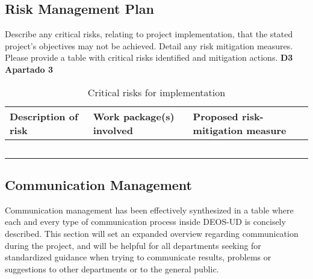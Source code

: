 \subsection{Risk Management Plan}

Describe any critical risks, relating to project implementation, that the stated project’s objectives may not be achieved. Detail any risk mitigation measures. Please provide a table with critical risks identified and mitigation actions. \textbf{D3 Apartado 3}

\begin{longtable}[H]{p{4cm} p{4.7cm} p{5cm}}
	\toprule[2pt]
	
	\textbf{Description of risk} & \textbf{Work package(s) involved} & \textbf{Proposed risk-mitigation measure} \\
	
	\midrule[1.5pt] 
	\endhead
	
	 &  &  \vspace{0.2cm} \\
	
	\midrule

	 &  &  \vspace{0.2cm} \\
	
	\midrule
	
	 &  &   \vspace{0.2cm} \\

	\midrule

 	 &  &   \vspace{0.2cm} \\
	
	\bottomrule[2pt]
	
	\caption{Critical risks for implementation}
	\label{workpackages}
\end{longtable}

\subsection{Communication Management}

Communication management has been effectively synthesized in a table where each and every type of communication process inside DEOS-UD is concisely described. This section will set an expanded overview regarding communication during the project, and will be helpful for all departments seeking for standardized guidance when trying to communicate results, problems or suggestions to other departments or to the general public. 

